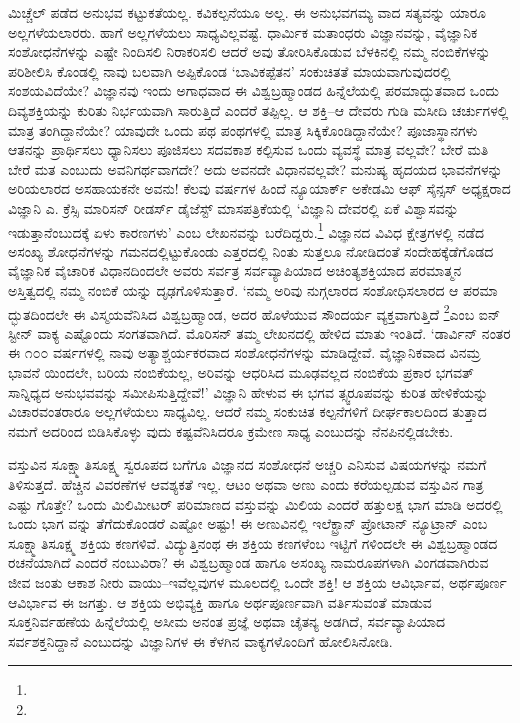 ಮಿಚ್ಚೆಲ್ ಪಡೆದ ಅನುಭವ ಕಟ್ಟುಕತೆಯಲ್ಲ. ಕವಿಕಲ್ಪನೆಯೂ ಅಲ್ಲ. ಈ ಅನುಭವಗಮ್ಯ ವಾದ ಸತ್ಯವನ್ನು ಯಾರೂ ಅಲ್ಲಗಳೆಯಲಾರರು. ಹಾಗೆ ಅಲ್ಲಗಳೆಯಲು ಸಾಧ್ಯವಿಲ್ಲವಷ್ಟೆ. ಧಾರ್ಮಿಕ ಮತಾಂಧರು ವಿಜ್ಞಾನವನ್ನು, ವೈಜ್ಞಾನಿಕ ಸಂಶೋಧನೆಗಳನ್ನು ಎಷ್ಟೇ ನಿಂದಿಸಲಿ ನಿರಾಕರಿಸಲಿ ಆದರೆ ಅವು ತೋರಿಸಿಕೊಡುವ ಬೆಳಕಿನಲ್ಲಿ ನಮ್ಮ ನಂಬಿಕೆಗಳನ್ನು ಪರಿಶೀಲಿಸಿ ಕೊಂಡಲ್ಲಿ ನಾವು ಬಲವಾಗಿ ಅಪ್ಪಿಕೊಂಡ ‘ಬಾವಿಕಪ್ಪೆತನ’ ಸಂಕುಚಿತತೆ ಮಾಯವಾಗುವುದರಲ್ಲಿ ಸಂಶಯವಿದೆಯೇ? ವಿಜ್ಞಾನವು ಇಂದು ಅಗಾಧವಾದ ಈ ವಿಶ್ವಬ್ರಹ್ಮಾಂಡದ ಹಿನ್ನೆಲೆಯಲ್ಲಿ ಪರಮಾದ್ಭುತವಾದ ಒಂದು ದಿವ್ಯಶಕ್ತಿಯನ್ನು ಕುರಿತು ನಿರ್ಭಯವಾಗಿ ಸಾರುತ್ತಿದೆ ಎಂದರೆ ತಪ್ಪಿಲ್ಲ. ಆ ಶಕ್ತಿ–ಆ ದೇವರು ಗುಡಿ ಮಸೀದಿ ಚರ್ಚುಗಳಲ್ಲಿ ಮಾತ್ರ ತಂಗಿದ್ದಾನೆಯೇ? ಯಾವುದೇ ಒಂದು ಪಥ ಪಂಥಗಳಲ್ಲಿ ಮಾತ್ರ ಸಿಕ್ಕಿಕೊಂಡಿದ್ದಾನೆಯೇ? ಪೂಜಾಸ್ಥಾನಗಳು ಆತನನ್ನು ಪ್ರಾರ್ಥಿಸಲು ಧ್ಯಾನಿಸಲು ಪೂಜಿಸಲು ಸದವಕಾಶ ಕಲ್ಪಿಸುವ ಒಂದು ವ್ಯವಸ್ಥೆ ಮಾತ್ರ ವಲ್ಲವೇ? ಬೇರೆ ಮತಿ ಬೇರೆ ಮತ ಎಂಬುದು ಅವನಿಗರ್ಥವಾಗದೇ? ಅದು ಅವನದೇ ವಿಧಾನವಲ್ಲವೇ? ಮನುಷ್ಯ ಹೃದಯದ ಭಾವನೆಗಳನ್ನು ಅರಿಯಲಾರದ ಅಸಹಾಯಕನೇ ಅವನು! ಕೆಲವು ವರ್ಷಗಳ ಹಿಂದೆ ನ್ಯೂಯಾರ್ಕ್ ಅಕೇಡಮಿ ಆಫ್ ಸೈನ್ಸಸ್ ಅಧ್ಯಕ್ಷರಾದ ವಿಜ್ಞಾನಿ ಎ. ಕ್ರೆಸ್ಸಿ ಮಾರಿಸನ್ ರೀಡರ್ಸ್ ಡೈಜೆಸ್ಟ್ ಮಾಸಪತ್ರಿಕೆಯಲ್ಲಿ ‘ವಿಜ್ಞಾನಿ ದೇವರಲ್ಲಿ ಏಕೆ ವಿಶ್ವಾಸವನ್ನು ಇಡುತ್ತಾನೆಂಬುದಕ್ಕೆ ಏಳು ಕಾರಣಗಳು’ ಎಂಬ ಲೇಖನವನ್ನು ಬರೆದಿದ್ದರು.\footnote{} ವಿಜ್ಞಾನದ ವಿವಿಧ ಕ್ಷೇತ್ರಗಳಲ್ಲಿ ನಡೆದ ಅಸಂಖ್ಯ ಶೋಧನೆಗಳನ್ನು ಗಮನದಲ್ಲಿಟ್ಟುಕೊಂಡು ಎತ್ತರದಲ್ಲಿ ನಿಂತು ಸುತ್ತಲೂ ನೋಡಿದಂತೆ ಸಂದೇಹಕ್ಕೆಡೆಗೊಡದ ವೈಜ್ಞಾನಿಕ ವೈಚಾರಿಕ ವಿಧಾನದಿಂದಲೇ ಅವರು ಸರ್ವತ್ರ ಸರ್ವವ್ಯಾಪಿಯಾದ ಅಚಿಂತ್ಯಶಕ್ತಿಯಾದ ಪರಮಾತ್ಮನ ಅಸ್ತಿತ್ವದಲ್ಲಿ ನಮ್ಮ ನಂಬಿಕೆ ಯನ್ನು ದೃಢಗೊಳಿಸುತ್ತಾರೆ. ‘ನಮ್ಮ ಅರಿವು ನುಗ್ಗಲಾರದ ಸಂಶೋಧಿಸಲಾರದ ಆ ಪರಮಾ ದ್ಭುತದಿಂದಲೇ ಈ ವಿಸ್ಮಯವೆನಿಸಿದ ವಿಶ್ವಬ್ರಹ್ಮಾಂಡ, ಅದರ ಹೊಳೆಯುವ ಸೌಂದರ್ಯ ವ್ಯಕ್ತವಾಗುತ್ತಿದೆ \footnote{}ಎಂಬ ಐನ್​ಸ್ಟೀನ್ ವಾಕ್ಯ ಎಷ್ಟೊಂದು ಸಂಗತವಾಗಿದೆ. ಮೊರಿಸನ್ ತಮ್ಮ ಲೇಖನದಲ್ಲಿ ಹೇಳಿದ ಮಾತು ಇಂತಿದೆ. ‘ಡಾರ್ವಿನ್ ನಂತರ ಈ ೧೦೦ ವರ್ಷಗಳಲ್ಲಿ ನಾವು ಅತ್ಯಾಶ್ಚರ್ಯಕರವಾದ ಸಂಶೋಧನೆಗಳನ್ನು ಮಾಡಿದ್ದೇವೆ. ವೈಜ್ಞಾನಿಕವಾದ ವಿನಮ್ರ ಭಾವನೆ ಯಿಂದಲೇ, ಬರಿಯ ನಂಬಿಕೆಯಲ್ಲ, ಅರಿವನ್ನು ಆಧರಿಸಿದ ಮೂಢವಲ್ಲದ ನಂಬಿಕೆಯ ಪ್ರಕಾರ ಭಗವತ್ ಸಾನ್ನಿಧ್ಯದ ಅನುಭವವನ್ನು ಸಮೀಪಿಸುತ್ತಿದ್ದೇವೆ!’ ವಿಜ್ಞಾನಿ ಹೇಳುವ ಈ ಭಗವ ತ್ಸ್ವರೂಪವನ್ನು ಕುರಿತ ಹೇಳಿಕೆಯನ್ನು ವಿಚಾರವಂತರಾರೂ ಅಲ್ಲಗಳೆಯಲು ಸಾಧ್ಯವಿಲ್ಲ. ಆದರೆ ನಮ್ಮ ಸಂಕುಚಿತ ಕಲ್ಪನೆಗಳಿಗೆ ದೀರ್ಘಕಾಲದಿಂದ ತುತ್ತಾದ ನಮಗೆ ಅದರಿಂದ ಬಿಡಿಸಿಕೊಳ್ಳು ವುದು ಕಷ್ಟವೆನಿಸಿದರೂ ಕ್ರಮೇಣ ಸಾಧ್ಯ ಎಂಬುದನ್ನು ನೆನಪಿನಲ್ಲಿಡಬೇಕು.

ವಸ್ತುವಿನ ಸೂಕ್ಷ್ಮಾತಿಸೂಕ್ಷ್ಮ ಸ್ವರೂಪದ ಬಗೆಗೂ ವಿಜ್ಞಾನದ ಸಂಶೋಧನೆ ಅಚ್ಚರಿ ಎನಿಸುವ ವಿಷಯಗಳನ್ನು ನಮಗೆ ತಿಳಿಸುತ್ತದೆ. ಹೆಚ್ಚಿನ ವಿವರಣೆಗಳ ಆವಶ್ಯಕತೆ ಇಲ್ಲ. ಆಟಂ ಅಥವಾ ಅಣು ಎಂದು ಕರೆಯಲ್ಪಡುವ ವಸ್ತುವಿನ ಗಾತ್ರ ಎಷ್ಟು ಗೊತ್ತೇ? ಒಂದು ಮಿಲಿಮೀಟರ್ ಪರಿಮಾಣದ ವಸ್ತುವನ್ನು ಮಿಲಿಯ ಎಂದರೆ ಹತ್ತುಲಕ್ಷ ಭಾಗ ಮಾಡಿ ಅದರಲ್ಲಿ ಒಂದು ಭಾಗ ವನ್ನು ತೆಗೆದುಕೊಂಡರೆ ಎಷ್ಟೋ ಅಷ್ಟು! ಈ ಅಣುವಿನಲ್ಲಿ ಇಲೆಕ್ಟ್ರಾನ್ ಪ್ರೋಟಾನ್ ನ್ಯೂಟ್ರಾನ್ ಎಂಬ ಸೂಕ್ಷ್ಮಾತಿಸೂಕ್ಷ್ಮ ಶಕ್ತಿಯ ಕಣಗಳಿವೆ. ವಿದ್ಯುತ್ತಿನಂಥ ಈ ಶಕ್ತಿಯ ಕಣಗಳೆಂಬ ಇಟ್ಟಿಗೆ ಗಳಿಂದಲೇ ಈ ವಿಶ್ವಬ್ರಹ್ಮಾಂಡದ ರಚನೆಯಾಗಿದೆ ಎಂದರೆ ನಂಬುವಿರಾ? ಈ ವಿಶ್ವಬ್ರಹ್ಮಾಂಡ ಹಾಗೂ ಅಸಂಖ್ಯ ನಾಮರೂಪಗಳಾಗಿ ವಿಂಗಡವಾಗಿರುವ ಜೀವ ಜಂತು ಆಕಾಶ ನೀರು ವಾಯು–ಇವೆಲ್ಲವುಗಳ ಮೂಲದಲ್ಲಿ ಒಂದೇ ಶಕ್ತಿ! ಆ ಶಕ್ತಿಯ ಆವಿರ್ಭಾವ, ಅರ್ಥಪೂರ್ಣ ಆವಿರ್ಭಾವ ಈ ಜಗತ್ತು. ಆ ಶಕ್ತಿಯ ಅಭಿವ್ಯಕ್ತಿ ಹಾಗೂ ಅರ್ಥಪೂರ್ಣವಾಗಿ ವರ್ತಿಸುವಂತೆ ಮಾಡುವ ಸೂಕ್ತನಿರ್ವಹಣೆಯ ಹಿನ್ನೆಲೆಯಲ್ಲಿ ಅಸೀಮ ಅನಂತ ಪ್ರಜ್ಞೆ ಅಥವಾ ಚೈತನ್ಯ ಅಡಗಿದೆ, ಸರ್ವವ್ಯಾಪಿಯಾದ ಸರ್ವಶಕ್ತನಿದ್ದಾನೆ ಎಂಬುದನ್ನು ವಿಜ್ಞಾನಿಗಳ ಈ ಕೆಳಗಿನ ವಾಕ್ಯಗಳೊಂದಿಗೆ ಹೋಲಿಸಿನೋಡಿ.

